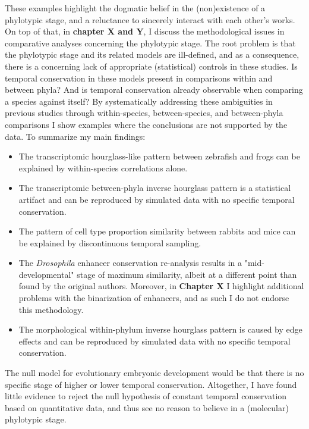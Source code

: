 These examples highlight the dogmatic belief in the (non)existence of a phylotypic stage, and a reluctance to sincerely interact with each other's works. On top of that, in \textbf{chapter X and Y}, I discuss the methodological issues in comparative analyses concerning the phylotypic stage. The root problem is that the phylotypic stage and its related models are ill-defined, and as a consequence, there is a concerning lack of appropriate (statistical) controls in these studies. Is temporal conservation in these models present in comparisons within and between phyla? And is temporal conservation already observable when comparing a species against itself? By systematically addressing these ambiguities in previous studies through within-species, between-species, and between-phyla comparisons I show examples where the conclusions are not supported by the data. To summarize my main findings:
\begin{itemize}
    \item The transcriptomic hourglass-like pattern between zebrafish and frogs\cite{marletaz2018} can be explained by within-species correlations alone.
    \item The transcriptomic between-phyla inverse hourglass pattern\cite{Levin2016} is a statistical artifact and can be reproduced by simulated data with no specific temporal conservation.
    \item The pattern of cell type proportion similarity between rabbits and mice\cite{Mayshar2023} can be explained by discontinuous temporal sampling.
    \item The \textit{Drosophila} enhancer conservation re-analysis results in a "mid-developmental" stage of maximum similarity, albeit at a different point than found by the original authors. Moreover, in \textbf{Chapter X} I highlight additional problems with the binarization of enhancers, and as such I do not endorse this methodology.
    \item  The morphological within-phylum inverse hourglass pattern is caused by edge effects and can be reproduced by simulated data with no specific temporal conservation.
\end{itemize}
\noindent
The null model for evolutionary embryonic development would be that there is no specific stage of higher or lower temporal conservation. Altogether, I have found little evidence to reject the null hypothesis of constant temporal conservation based on quantitative data, and thus see no reason to believe in a (molecular) phylotypic stage.

